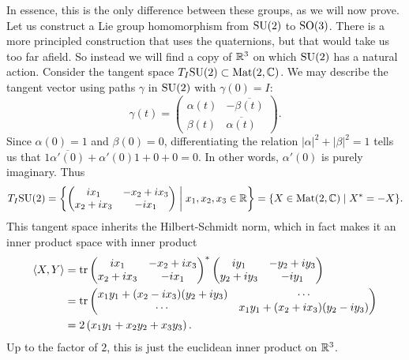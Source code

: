 In essence, this is the only difference between these groups, as we will now prove.
Let us construct a Lie group homomorphism from $\mathrm{SU}(2)$ to $\mathrm{SO}(3)$.
There is a more principled construction that uses the quaternions, but that would take us too far afield. 
So instead we will find a copy of $\mathbb{R}^3$ on which $\mathrm{SU}(2)$ has a natural action.
Consider the tangent space $T_I\mathrm{SU}(2) \subset \operatorname{Mat}(2,\mathbb{C})$.
We may describe the tangent vector using paths $\gamma$ in $\mathrm{SU}(2)$ with $\gamma(0) = I$:
\[
\gamma(t) = \begin{pmatrix} \alpha(t) & -\overline{\beta(t)} \\ \beta(t) & \overline{\alpha(t)} \end{pmatrix}.
\]
Since $\alpha(0) = 1$ and $\beta(0) = 0$, differentiating the relation $|\alpha|^2 + |\beta|^2 = 1$ tells us that $1\overline{\alpha'(0)} + \alpha'(0)1 + 0 + 0 = 0$.
In other words, $\alpha'(0)$ is purely imaginary.
Thus
\[
T_I\mathrm{SU}(2) 
= \left\{ \begin{pmatrix} i x_1 & -x_2 + i x_3 \\ x_2 + i x_3 & -ix_1 \end{pmatrix} \;\middle|\; x_1,x_2,x_3 \in \mathbb{R} \right\}
= \{ X \in \operatorname{Mat}(2,\mathbb{C}) \mid X^\ast = - X\}.
\]
This tangent space inherits the Hilbert-Schmidt norm, which in fact makes it an inner product space with inner product
\begin{align*}
\langle X, Y \rangle
&= \operatorname{tr} \begin{pmatrix} i x_1 & -x_2 + i x_3 \\ x_2 + i x_3 & -ix_1 \end{pmatrix}^\ast\begin{pmatrix} i y_1 & -y_2 + i y_3 \\ y_2 + i y_3 & -iy_1 \end{pmatrix} \\
&= \operatorname{tr} \begin{pmatrix}
x_1y_1 + (x_2 - i x_3)(y_2 + i y_3) & \cdots \\
\cdots & x_1y_1 + (x_2 + i x_3)(y_2 - i y_3)
\end{pmatrix} \\
&= 2\left(x_1y_1 + x_2y_2 + x_3y_3\right).
\end{align*}
Up to the factor of $2$, this is just the euclidean inner product on $\mathbb{R}^3$.

